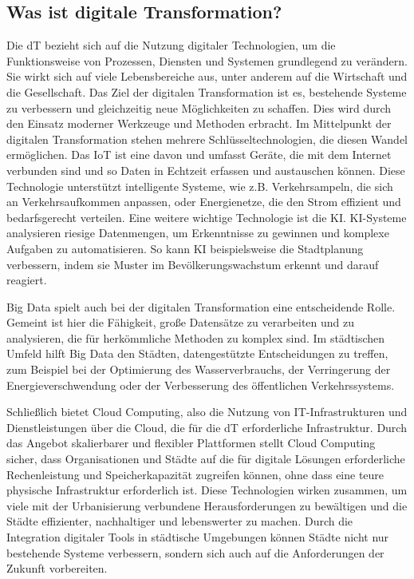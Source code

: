 \documentclass[conference,compsoc,final,a4paper, onecolumn, 11pt]{IEEEtran}
\begin{document}
\subsection{Was ist digitale Transformation?}
Die \ac{dT} bezieht sich auf die Nutzung digitaler Technologien, um die Funktionsweise von Prozessen, Diensten und Systemen grundlegend zu verändern. 
Sie wirkt sich auf viele Lebensbereiche aus, unter anderem auf die Wirtschaft und die Gesellschaft. 
Das Ziel der digitalen Transformation ist es, bestehende Systeme zu verbessern und gleichzeitig neue Möglichkeiten zu schaffen. 
Dies wird durch den Einsatz moderner Werkzeuge und Methoden erbracht. \autocite{agustian_impact_2023}
Im Mittelpunkt der digitalen Transformation stehen mehrere Schlüsseltechnologien, die diesen Wandel ermöglichen. 
Das \ac{IoT} ist eine davon und umfasst Geräte, die mit dem Internet verbunden sind und so Daten in Echtzeit erfassen und austauschen können. \autocite{noauthor_next_2024}
Diese Technologie unterstützt intelligente Systeme, wie z.B. Verkehrsampeln, die sich an Verkehrsaufkommen anpassen, oder Energienetze, die den Strom effizient und bedarfsgerecht verteilen.
Eine weitere wichtige Technologie ist die \ac{KI}. 
\ac{KI}-Systeme analysieren riesige Datenmengen, um Erkenntnisse zu gewinnen und komplexe Aufgaben zu automatisieren. 
So kann \ac{KI} beispielsweise die Stadtplanung verbessern, indem sie Muster im Bevölkerungswachstum erkennt und darauf reagiert. \autocite{sasidhar_parasa_artificial_2023}

Big Data spielt auch bei der digitalen Transformation eine entscheidende Rolle. 
Gemeint ist hier die Fähigkeit, große Datensätze zu verarbeiten und zu analysieren, die für herkömmliche Methoden zu komplex sind. 
Im städtischen Umfeld hilft Big Data den Städten, datengestützte Entscheidungen zu treffen, zum Beispiel bei der Optimierung des Wasserverbrauchs, der Verringerung der Energieverschwendung oder der Verbesserung des öffentlichen Verkehrssystems. \autocite{ma_role_2024}

Schließlich bietet Cloud Computing, also die Nutzung von IT-Infrastrukturen und Dienstleistungen über die Cloud, die für die \ac{dT} erforderliche Infrastruktur. 
Durch das Angebot skalierbarer und flexibler Plattformen stellt Cloud Computing sicher, dass Organisationen und Städte auf die für digitale Lösungen erforderliche Rechenleistung und Speicherkapazität zugreifen können, ohne dass eine teure physische Infrastruktur erforderlich ist. \autocite{saarikko_digital_2020} 
Diese Technologien wirken zusammen, um viele mit der Urbanisierung verbundene Herausforderungen zu bewältigen und die Städte effizienter, nachhaltiger und lebenswerter zu machen. 
Durch die Integration digitaler Tools in städtische Umgebungen können Städte nicht nur bestehende Systeme verbessern, sondern sich auch auf die Anforderungen der Zukunft vorbereiten.
\end{document}
